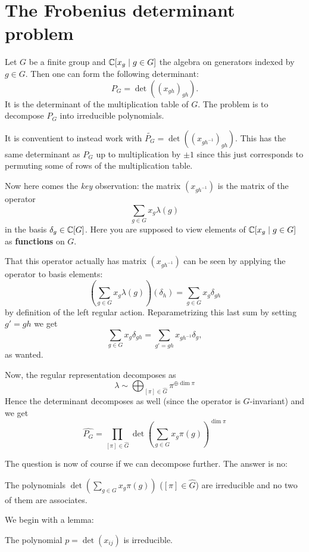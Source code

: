 \documentclass[11pt, english]{article}
\begin{document}
\newpage
\section{The Frobenius determinant problem}

Let $G$ be a finite group and $\mathbb{C}[x_g \mid g \in G]$ the algebra on generators indexed by $g \in G$. Then one can form the following determinant:
$$
P_G  = \det \left( (x_{gh})_{gh} \right).
$$
It is the determinant of the multiplication table of $G$. The problem is to decompose $P_G$ into irreducible polynomials.

It is conventient to instead work with $\widetilde{P_G}=\det( {(x_{gh^{-1}})}_{gh})$. This has the same determinant as $P_G$ up to multiplication by $\pm 1$ since this just corresponds to permuting some of rows of the multiplication table.

Now here comes the \emph{key} observation: the matrix $(x_{gh^{-1}})$ is the matrix of the operator 
$$
\sum_{g \in G} x_g \lambda(g)
$$
in the basis $\delta_g \in \mathbb{C}[G]$. Here you are supposed to view elements of $\mathbb{C}[x_g \mid g \in G]$ as \textbf{functions} on $G$.

That this operator actually has matrix $(x_{gh^{-1}})$ can be seen by applying the operator to basis elements:
$$
\left(\sum_{g \in G} x_g \lambda(g)\right)(\delta_h) = \sum_{g \in G} x_g \delta_{gh}
$$
by definition of the left regular action. Reparametrizing this last sum by setting $g' = gh$ we get
$$
\sum_{g \in G} x_g \delta_{gh} = \sum_{g' = gh} x_{gh^{-1}} \delta_g,
$$
as wanted.

Now, the regular representation decomposes as
$$
\lambda \sim \bigoplus_{[\pi] \in \widehat G}  \pi^{\oplus \dim \pi}
$$
Hence the determinant decomposes as well (since the operator is $G$-invariant) and we get
$$
\widehat{P_G} = \prod_{[\pi] \in \widehat G} \det\left( \sum_{g \in G} x_g \pi(g) \right)^{\dim \pi}
$$

The question is now of course if we can decompose further. The answer is no:

\begin{thm}[Frobenius]
The polynomials $\det\left(\sum_{g \in G} x_g \pi(g) \right)$ ($[\pi] \in \widehat G$) are irreducible and no two of them are associates.
\end{thm}

We begin with a lemma:
\begin{lemma}
 The polynomial $p=\det (x_{ij})$ is irreducible.
\end{lemma}
\end{document}
